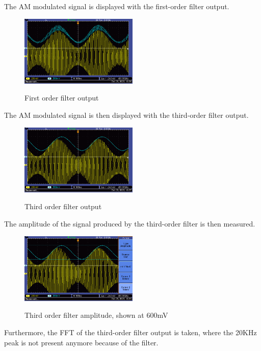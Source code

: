 The AM modulated signal is displayed with the first-order filter output.
\begin{figure}[H]
    \centering
    \includegraphics[width=0.5\textwidth]{images/execution_03_first_order.png}
    \label{fig:execution_03_first_order}
    \caption{First order filter output}
\end{figure}
The AM modulated signal is then displayed with the third-order filter output.
\begin{figure}[H]
    \centering
    \includegraphics[width=0.5\textwidth]{images/execution_03_third_order.png}
    \label{fig:execution_03_third_order}
    \caption{Third order filter output}
\end{figure}

The amplitude of the signal produced by the third-order filter is then measured.

\begin{figure}[H]
    \centering
    \includegraphics[width=0.5\textwidth]{images/execution_03_third_order_amp.png}
    \label{fig:execution_03_third_order_amp}
    \caption{Third order filter amplitude, shown at 600mV}
\end{figure}

Furthermore, the FFT of the third-order filter output is taken, where the 20KHz peak is not present anymore because of the filter.

